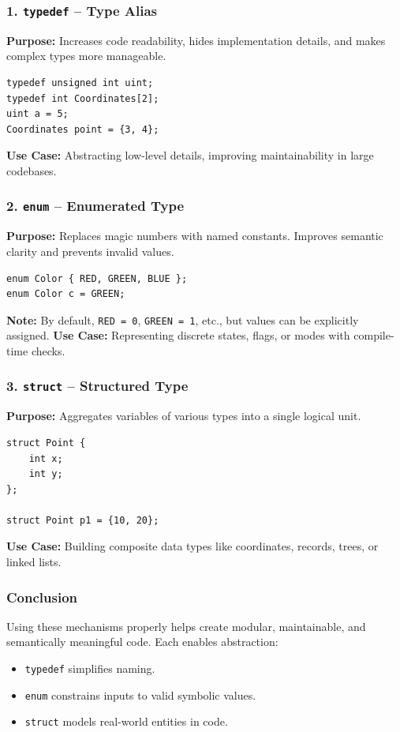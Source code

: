 \documentclass[a4paper, 10pt]{article}
\begin{document}
\subsubsection*{1. \texttt{typedef} -- Type Alias}
\textbf{Purpose:} Increases code readability, hides implementation details, and makes complex types more manageable.
\begin{verbatim}
typedef unsigned int uint;
typedef int Coordinates[2];
uint a = 5;
Coordinates point = {3, 4};
\end{verbatim}
\textbf{Use Case:} Abstracting low-level details, improving maintainability in large codebases.
\subsubsection*{2. \texttt{enum} -- Enumerated Type}
\textbf{Purpose:} Replaces magic numbers with named constants. Improves semantic clarity and prevents invalid values.

\begin{verbatim}
enum Color { RED, GREEN, BLUE };
enum Color c = GREEN;
\end{verbatim}
\textbf{Note:} By default, \texttt{RED = 0}, \texttt{GREEN = 1}, etc., but values can be explicitly assigned.
\textbf{Use Case:} Representing discrete states, flags, or modes with compile-time checks.
\subsubsection*{3. \texttt{struct} -- Structured Type}
\textbf{Purpose:} Aggregates variables of various types into a single logical unit.
\begin{verbatim}
struct Point {
    int x;
    int y;
};

struct Point p1 = {10, 20};
\end{verbatim}
\textbf{Use Case:} Building composite data types like coordinates, records, trees, or linked lists.
\subsubsection*{Conclusion}
Using these mechanisms properly helps create modular, maintainable, and semantically meaningful code. Each enables abstraction:
\begin{itemize}
    \item \texttt{typedef} simplifies naming.
    \item \texttt{enum} constrains inputs to valid symbolic values.
    \item \texttt{struct} models real-world entities in code.
\end{itemize}
\end{document}
